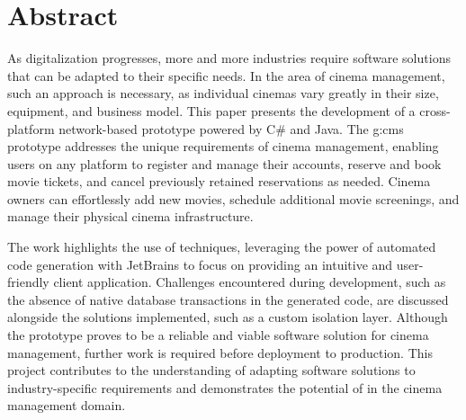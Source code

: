 \chapter{Abstract}

As digitalization progresses, more and more industries require software solutions that can be adapted to their specific needs. In the area of cinema management, such an approach is necessary, as individual cinemas vary greatly in their size, equipment, and business model. This paper presents the development of a cross-platform network-based  prototype powered by C\# and Java. The \gls{g:cms} prototype addresses the unique requirements of cinema management, enabling users on any platform to register and manage their accounts, reserve and book movie tickets, and cancel previously retained reservations as needed. Cinema owners can effortlessly add new movies, schedule additional movie screenings, and manage their physical cinema infrastructure.

\vspace{.1cm}
\hspace{-.6cm}The work highlights the use of  techniques, leveraging the power of automated code generation with JetBrains  to focus on providing an intuitive and user-friendly client application. Challenges encountered during development, such as the absence of native database transactions in the generated code, are discussed alongside the solutions implemented, such as a custom isolation layer. Although the  prototype proves to be a reliable and viable software solution for cinema management, further work is required before deployment to production. This project contributes to the understanding of adapting software solutions to industry-specific requirements and demonstrates the potential of  in the cinema management domain.